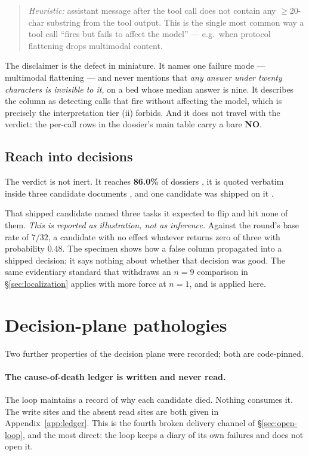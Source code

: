 \begin{quote}\small
\emph{Heuristic:} assistant message after the tool call does not contain
any $\ge$20-char substring from the tool output. This is the single most
common way a tool call ``fires but fails to affect the model'' --- e.g.\
when protocol flattening drops multimodal content.
\end{quote}

The disclaimer is the defect in miniature. It names one failure mode ---
multimodal flattening --- and never mentions that \emph{any answer under
twenty characters is invisible to it}, on a bed whose median answer is
nine. It describes the column as detecting calls that fire without
affecting the model, which is precisely the interpretation tier (ii)
forbids. And it does not travel with the verdict: the per-call rows in the
dossier's main table carry a bare \textbf{NO}.

\subsection*{Reach into decisions}

The verdict is not inert. It reaches \textbf{86.0\%} of dossiers , it
is quoted verbatim inside three candidate documents \F{5}, and one
candidate was shipped on it \F{6}.

That shipped candidate named three tasks it expected to flip and hit none
of them. \emph{This is reported as illustration, not as inference.} Against
the round's base rate of $7/32$, a candidate with no effect whatever
returns zero of three with probability $0.48$. The specimen shows how a
false column propagated into a shipped decision; it says nothing about
whether that decision was good. The same evidentiary standard that
withdraws an $n{=}9$ comparison in \S\ref{sec:localization} applies with
more force at $n{=}1$, and is applied here.

\section{Decision-plane pathologies}
\label{sec:decision}

Two further properties of the decision plane were recorded; both are
code-pinned.

\paragraph{The cause-of-death ledger is written and never read.} The loop
maintains a record of why each candidate died. Nothing consumes it. The
write sites and the absent read sites are both given in
Appendix~\ref{app:ledger}. This is the fourth broken delivery channel of
\S\ref{sec:open-loop}, and the most direct: the loop keeps a diary of its
own failures and does not open it.

